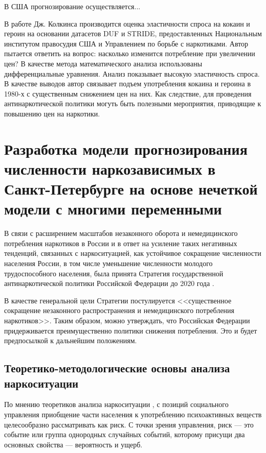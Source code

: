 \documentclass[a4paper,14pt]{article}
\begin{document}
В США прогнозирование осуществляется...

В работе Дж. Колкинса \cite{Caulkins1995} производится оценка эластичности спроса 
на кокаин и героин на основании датасетов DUF и STRIDE, предоставленных
Национальным институтом правосудия США и Управлением по борьбе с наркотиками.
Автор пытается ответить на вопрос: насколько изменится потребление при
увеличении цен? В качестве метода математического анализа использованы
дифференциальные уравнения. Анализ показывает высокую эластичность спроса. В
качестве выводов автор связывает подъем употребления кокаина и героина в 1980-х
с существенным снижением цен на них. Как следствие, для проведения
антинаркотической политики могуть быть полезными мероприятия, приводящие к
повышению цен на наркотики.


\section{Разработка модели прогнозирования численности наркозависимых в 
    Санкт-Петербурге на основе нечеткой модели с многими переменными}

В связи с расширением масштабов незаконного оборота и немедицинского потребления 
наркотиков  в России и в ответ на усиление таких негативных тенденций, связанных 
с наркоситуацией, как устойчивое сокращение численности населения России, в том 
числе уменьшение численности молодого трудоспособного населения, была принята 
Стратегия государственной антинаркотической политики
Российской Федерации до 2020 года \cite{ru_nat_drug_strat}. 

В качестве генеральной цели Стратегии постулируется <<существенное сокращение 
незаконного распространения и немедицинского потребления наркотиков>>. Таким 
образом, можно утверждать, что Российская Федерации придерживается 
преимущественно политики снижения потребления. Это и будет предпосылкой к 
дальнейшим положениям.

\subsection{Теоретико-методологические основы анализа наркоситуации}

По мнению теоретиков анализа наркоситуации \cite{Karpets2010}, с позиций
социального управления приобщение части населения к употреблению психоактивных
веществ целесообразно рассматривать как риск. С точки зрения управления, риск
–-- это событие или группа однородных случайных событий, которому присущи два
основных свойства --– вероятность и ущерб.
\end{document}
